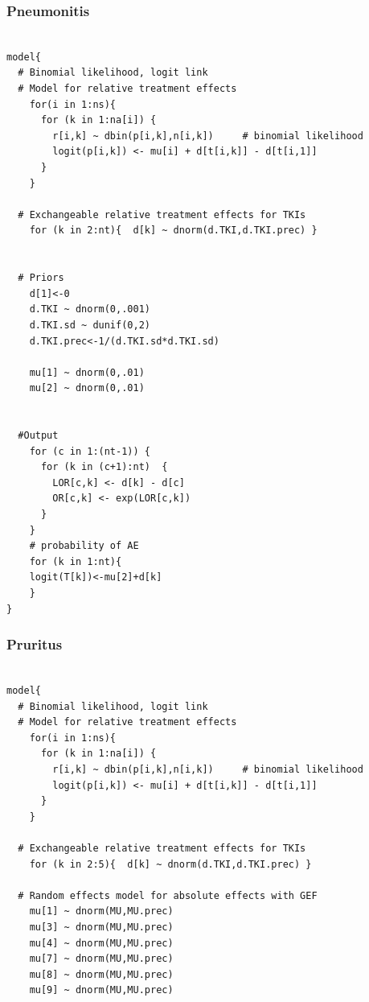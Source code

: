 \documentclass[11pt,final,fleqn]{article}\usepackage[]{graphicx}\usepackage[]{color}
\theoremstyle{plain}
\begin{document}
\begin{appendices}
\begin{verbatim}
\end{verbatim}

\subsubsection{Pneumonitis} 
\begin{verbatim} 

model{
  # Binomial likelihood, logit link
  # Model for relative treatment effects
    for(i in 1:ns){                  
      for (k in 1:na[i]) {               
        r[i,k] ~ dbin(p[i,k],n[i,k])     # binomial likelihood
        logit(p[i,k]) <- mu[i] + d[t[i,k]] - d[t[i,1]]  
      }
    }   
  
  # Exchangeable relative treatment effects for TKIs
    for (k in 2:nt){  d[k] ~ dnorm(d.TKI,d.TKI.prec) }
  
       
  # Priors
    d[1]<-0                                      
    d.TKI ~ dnorm(0,.001)
    d.TKI.sd ~ dunif(0,2) 
    d.TKI.prec<-1/(d.TKI.sd*d.TKI.sd)
      
    mu[1] ~ dnorm(0,.01)                         
    mu[2] ~ dnorm(0,.01)
    
      
  #Output                                     
    for (c in 1:(nt-1)) {                        
      for (k in (c+1):nt)  { 
        LOR[c,k] <- d[k] - d[c]
        OR[c,k] <- exp(LOR[c,k])
      }  
    }
    # probability of AE
    for (k in 1:nt){ 
    logit(T[k])<-mu[2]+d[k]
    }
}

\end{verbatim}

\subsubsection{Pruritus} 
\begin{verbatim} 

model{
  # Binomial likelihood, logit link
  # Model for relative treatment effects
    for(i in 1:ns){                  
      for (k in 1:na[i]) {               
        r[i,k] ~ dbin(p[i,k],n[i,k])     # binomial likelihood
        logit(p[i,k]) <- mu[i] + d[t[i,k]] - d[t[i,1]]  
      }
    }   
      
  # Exchangeable relative treatment effects for TKIs
    for (k in 2:5){  d[k] ~ dnorm(d.TKI,d.TKI.prec) }
  
  # Random effects model for absolute effects with GEF
    mu[1] ~ dnorm(MU,MU.prec) 
    mu[3] ~ dnorm(MU,MU.prec) 
    mu[4] ~ dnorm(MU,MU.prec)
    mu[7] ~ dnorm(MU,MU.prec)
    mu[8] ~ dnorm(MU,MU.prec) 
    mu[9] ~ dnorm(MU,MU.prec) 
       

\end{verbatim}
\end{appendices}
\end{document}
